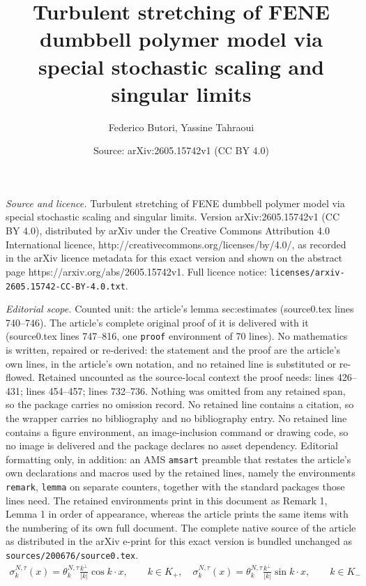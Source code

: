 \documentclass[10pt,a4paper]{amsart}
\title{Turbulent stretching of FENE dumbbell polymer model via special stochastic scaling and singular limits}
\author{Federico Butori, Yassine Tahraoui}
\date{Source: arXiv:2605.15742v1 (CC BY 4.0)}
\begin{document}
\maketitle

\noindent\emph{Source and licence.} Turbulent stretching of FENE dumbbell polymer model via special stochastic scaling and singular limits. Version arXiv:2605.15742v1 (CC BY 4.0), distributed by arXiv under the Creative Commons Attribution 4.0 International licence, http://creativecommons.org/licenses/by/4.0/, as recorded in the arXiv licence metadata for this exact version and shown on the abstract page https://arxiv.org/abs/2605.15742v1. Full licence notice: \texttt{licenses/arxiv-2605.15742-CC-BY-4.0.txt}.\par\smallskip

\noindent\textit{Editorial scope.} Counted unit: the article's lemma sec:estimates (source0.tex lines 740--746). The article's complete original proof of it is delivered with it (source0.tex lines 747--816, one \texttt{proof} environment of 70 lines). No mathematics is written, repaired or re-derived: the statement and the proof are the article's own lines, in the article's own notation, and no retained line is substituted or re-flowed.  Retained uncounted as the source-local context the proof needs: lines 426--431; lines 454--457; lines 732--736.  Nothing was omitted from any retained span, so the package carries no omission record.  No retained line contains a citation, so the wrapper carries no bibliography and no bibliography entry.  No retained line contains a figure environment, an image-inclusion command or drawing code, so no image is delivered and the package declares no asset dependency.  Editorial formatting only, in addition: an AMS \texttt{amsart} preamble that restates the article's own declarations and macros used by the retained lines, namely the environments \texttt{remark}, \texttt{lemma} on separate counters, together with the standard packages those lines need.  The retained environments print in this document as Remark 1, Lemma 1 in order of appearance, whereas the article prints the same items with the numbering of its own full document.  The complete native source of the article as distributed in the arXiv e-print for this exact version is bundled unchanged as \texttt{sources/200676/source0.tex}.
\begin{align}\label{Def-sigma-k}
\sigma_{k}^{N,\tau}\left(  x\right)     =\theta_{k}^{N,\tau}\frac{k^{\perp}}{\left\vert
k\right\vert }\cos k\cdot x,\qquad k\in K_{+},  \quad 
\sigma_{k}^{N,\tau}\left(  x\right)     =\theta_{k}^{N,\tau}\frac{k^{\perp}}{\left\vert
k\right\vert }\sin k\cdot x,\qquad k\in K_{-}%
\end{align}
\end{document}
